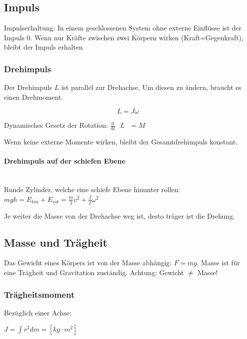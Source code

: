 \documentclass[a4paper]{scrartcl}
\newcommand{\abl}[2]{\frac{\text{d}}{\text{d}#2}\text{ } #1 \text{ }}
\begin{document}
\subsection{Impuls}

Impulserhaltung: In einem geschlossenen System ohne externe Einflüsse ist der Impuls 0. Wenn nur Kräfte zwischen zwei Körpern wirken (Kraft=Gegenkraft), bleibt der Impuls erhalten
	
\subsubsection{Drehimpuls}
	Der Drehimpuls $L$ ist parallel zur Drehachse. Um diesen zu ändern, braucht es einen Drehmoment.

	\[
	L = J \omega %
	\]
	
	Dynamisches Gesetz der Rotation:
	$\abl{L}{t} = M$
	
	 Wenn keine externe Momente wirken, bleibt der Gesamtdrehimpuls konstant.
	
	\paragraph{Drehimpuls auf der schiefen Ebene} \hfill \\
	
	Runde Zylinder, welche eine schiefe Ebene hinunter rollen: $mgh = E_{kin} + E_{rot} =\frac{m}{2} v^2 + \frac{J}{2} \omega^2$
	
	Je weiter die Masse von der Drehachse weg ist, desto träger ist die Drehung.

\subsection{Masse und Trägheit}
	Das Gewicht eines Körpers ist von der Masse abhängig: $F = mg$.
	Masse ist für eine Trägheit und Gravitation zuständig. Achtung: Gewicht $\neq$ Masse!

\subsubsection{Trägheitsmoment}

	
	Bezüglich einer Achse:
	
	$J = \int r^2 d m = \left[ kg \cdot m^2 \right]$
\end{document}
